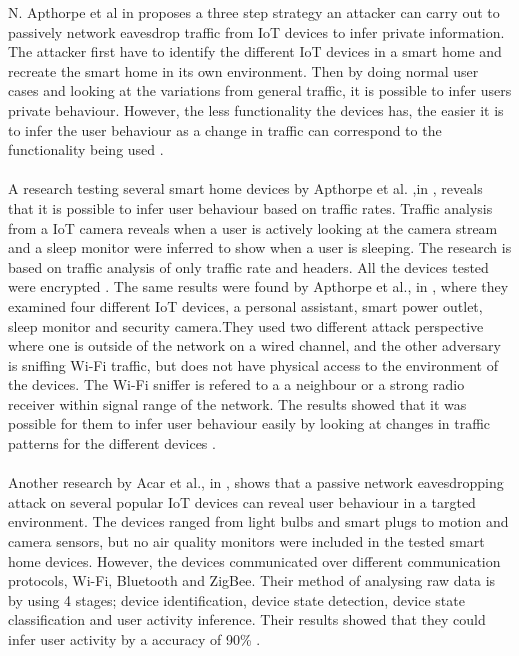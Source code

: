 N. Apthorpe et al in \cite{VulEncIoTTraffic} proposes a three step strategy an attacker can carry out to passively network eavesdrop traffic from IoT devices to infer private information. The attacker first have to identify the different IoT devices in a smart home and recreate the smart home in its own environment. Then by doing normal user cases and looking at the variations from general traffic, it is possible to infer users private behaviour. However, the less functionality the devices has, the easier it is to infer the user behaviour as a change in traffic can correspond to the functionality being used \cite{VulEncIoTTraffic}. 
\\\\
A research testing several smart home devices by Apthorpe et al. ,in \cite{SpyingonSmartHomes}, reveals that it is possible to infer user behaviour based on traffic rates. Traffic analysis from a IoT camera reveals when a user is actively looking at the camera stream and a sleep monitor were inferred to show when a user is sleeping. The research is based on traffic analysis of only traffic rate and headers. All the devices tested were encrypted \cite{SpyingonSmartHomes}. The same results were found by Apthorpe et al., in \cite{WiFiSniffInfer}, where they examined four different IoT devices, a personal assistant, smart power outlet, sleep monitor and security camera.They used two different attack perspective where one is outside of the network on a wired channel, and the other adversary is sniffing Wi-Fi traffic, but does not have physical access to the environment of the devices. The Wi-Fi sniffer is refered to a a neighbour or a strong radio receiver within signal range of the network. The results showed that it was possible for them to infer user behaviour easily by looking at changes in traffic patterns for the different devices \cite{WiFiSniffInfer}. 
\\\\
Another research by Acar et al., in \cite{PeakaBoo}, shows that a passive network eavesdropping attack on several popular IoT devices can reveal user behaviour in a targted environment. The devices ranged from light bulbs and smart plugs to motion and camera sensors, but no air quality monitors were included in the tested smart home devices. However, the devices communicated over different communication protocols, Wi-Fi, Bluetooth and ZigBee. Their method of analysing raw data is by using 4 stages; device identification, device state detection, device state classification and user activity inference. Their results showed that they could infer user activity by a accuracy of 90\% \cite{PeakaBoo}. 
